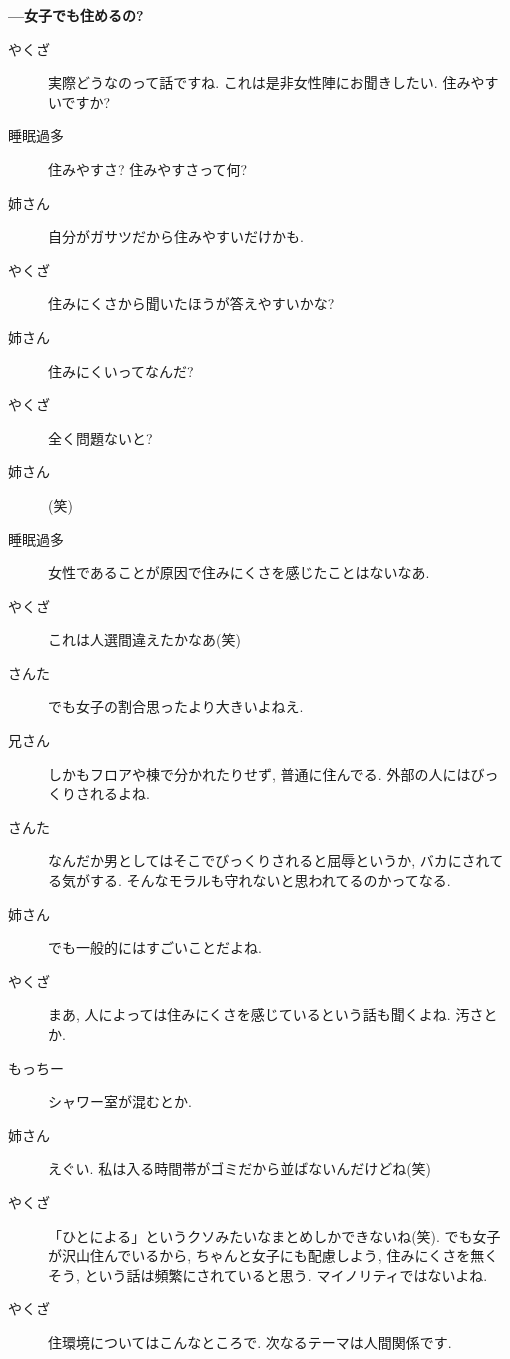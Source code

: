 \documentclass[10pt,b5jsbook,dvips,dvipdfmx,openany]{jsbook}
\theoremstyle{definition}
\begin{document}
\begin{multicols}{2}
		\textbf{---女子でも住めるの? }
		\begin{description}
		\item[やくざ]実際どうなのって話ですね. これは是非女性陣にお聞きしたい. 住みやすいですか? 
		\item[睡眠過多]住みやすさ? 住みやすさって何? 
		\item[姉さん]自分がガサツだから住みやすいだけかも. 
		\item[やくざ]住みにくさから聞いたほうが答えやすいかな? 
		\item[姉さん]住みにくいってなんだ? 
		\item[やくざ]全く問題ないと? 
		\item[姉さん](笑)
		\item[睡眠過多]女性であることが原因で住みにくさを感じたことはないなあ. 
		\item[やくざ]これは人選間違えたかなあ(笑)
		\item[さんた]でも女子の割合思ったより大きいよねえ. 
		\item[兄さん]しかもフロアや棟で分かれたりせず, 普通に住んでる. 外部の人にはびっくりされるよね. 
		\item[さんた]なんだか男としてはそこでびっくりされると屈辱というか, バカにされてる気がする. そんなモラルも守れないと思われてるのかってなる. 
		\item[姉さん]でも一般的にはすごいことだよね. 
		\item[やくざ]まあ, 人によっては住みにくさを感じているという話も聞くよね. 汚さとか. 
		\item[もっちー]シャワー室が混むとか. 
		\item[姉さん]えぐい. 私は入る時間帯がゴミだから並ばないんだけどね(笑)
		\item[やくざ]「ひとによる」というクソみたいなまとめしかできないね(笑). でも女子が沢山住んでいるから, ちゃんと女子にも配慮しよう, 住みにくさを無くそう, という話は頻繁にされていると思う. マイノリティではないよね. 
		\item[やくざ]住環境についてはこんなところで. 次なるテーマは人間関係です. 
		\end{description}


\end{multicols}
\end{document}
